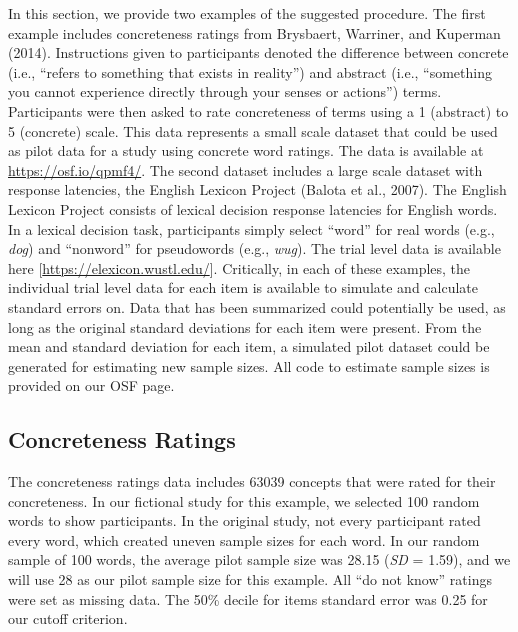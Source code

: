 \documentclass[
  man]{apa6}
\begin{document}
In this section, we provide two examples of the suggested procedure. The first example includes concreteness ratings from Brysbaert, Warriner, and Kuperman (2014). Instructions given to participants denoted the difference between concrete (i.e., ``refers to something that exists in reality'') and abstract (i.e., ``something you cannot experience directly through your senses or actions'') terms. Participants were then asked to rate concreteness of terms using a 1 (abstract) to 5 (concrete) scale. This data represents a small scale dataset that could be used as pilot data for a study using concrete word ratings. The data is available at \url{https://osf.io/qpmf4/}. The second dataset includes a large scale dataset with response latencies, the English Lexicon Project (Balota et al., 2007). The English Lexicon Project consists of lexical decision response latencies for English words. In a lexical decision task, participants simply select ``word'' for real words (e.g., \emph{dog}) and ``nonword'' for pseudowords (e.g., \emph{wug}). The trial level data is available here {[}\url{https://elexicon.wustl.edu/}{]}. Critically, in each of these examples, the individual trial level data for each item is available to simulate and calculate standard errors on. Data that has been summarized could potentially be used, as long as the original standard deviations for each item were present. From the mean and standard deviation for each item, a simulated pilot dataset could be generated for estimating new sample sizes. All code to estimate sample sizes is provided on our OSF page.

\hypertarget{concreteness-ratings}{%
\subsection{Concreteness Ratings}\label{concreteness-ratings}}

The concreteness ratings data includes 63039 concepts that were rated for their concreteness. In our fictional study for this example, we selected 100 random words to show participants. In the original study, not every participant rated every word, which created uneven sample sizes for each word. In our random sample of 100 words, the average pilot sample size was 28.15 (\emph{SD} = 1.59), and we will use 28 as our pilot sample size for this example. All ``do not know'' ratings were set as missing data. The 50\% decile for items standard error was 0.25 for our cutoff criterion.
\end{document}
